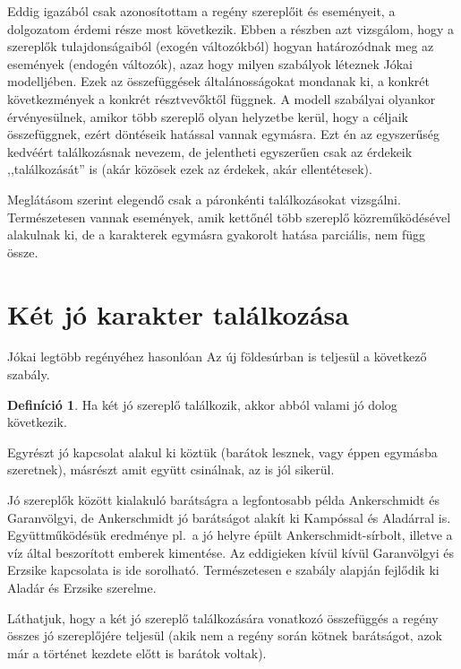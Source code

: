 \documentclass{thesis-ekf}
\theoremstyle{definition}
\newtheorem{definicio}{Definíció}[chapter]
\begin{document}
    Eddig igazából csak azonosítottam a regény szereplőit és eseményeit, a dolgozatom érdemi része most következik.
    Ebben a részben azt vizsgálom, hogy a szereplők tulajdonságaiból (exogén változókból)
        hogyan határozódnak meg az események (endogén változók), azaz hogy milyen szabályok léteznek Jókai modelljében.
    Ezek az összefüggések általánosságokat mondanak ki, a konkrét következmények a konkrét résztvevőktől függnek.
    A modell szabályai olyankor érvényesülnek, amikor több szereplő olyan helyzetbe kerül, hogy a céljaik összefüggnek,
        ezért döntéseik hatással vannak egymásra.
    Ezt én az egyszerűség kedvéért találkozásnak nevezem, de jelentheti egyszerűen csak az érdekeik ,,találkozását'' is
        (akár közösek ezek az érdekek, akár ellentétesek).

    Meglátásom szerint elegendő csak a páronkénti találkozásokat vizsgálni.
    Természetesen vannak események, amik kettőnél több szereplő közreműködésével alakulnak ki,
        de a karakterek egymásra gyakorolt hatása parciális, nem függ össze.

    \section{Két jó karakter találkozása}\label{sec:ket-jo-karakter-talalkozasa}

    Jókai legtöbb regényéhez hasonlóan Az új földesúrban is teljesül a következő szabály.
    \begin{definicio}\label{def:ket-jo}
        Ha két jó szereplő találkozik, akkor abból valami jó dolog következik.
    \end{definicio}
    Egyrészt jó kapcsolat alakul ki köztük (barátok lesznek, vagy éppen egymásba szeretnek),
        másrészt amit együtt csinálnak, az is jól sikerül.

    Jó szereplők között kialakuló barátságra a legfontosabb példa Ankerschmidt és Garanvölgyi,
        de Ankerschmidt jó barátságot alakít ki Kampóssal és Aladárral is.
    Együttműködésük eredménye pl.~a jó helyre épült Ankerschmidt-sírbolt, illetve a víz által beszorított emberek kimentése.
    Az eddigieken kívül kívül Garanvölgyi és Erzsike kapcsolata is ide sorolható.
    Természetesen e szabály alapján fejlődik ki Aladár és Erzsike szerelme.

    Láthatjuk, hogy a két jó szereplő találkozására vonatkozó összefüggés a regény összes jó szereplőjére teljesül
        (akik nem a regény során kötnek barátságot, azok már a történet kezdete előtt is barátok voltak).
\end{document}

